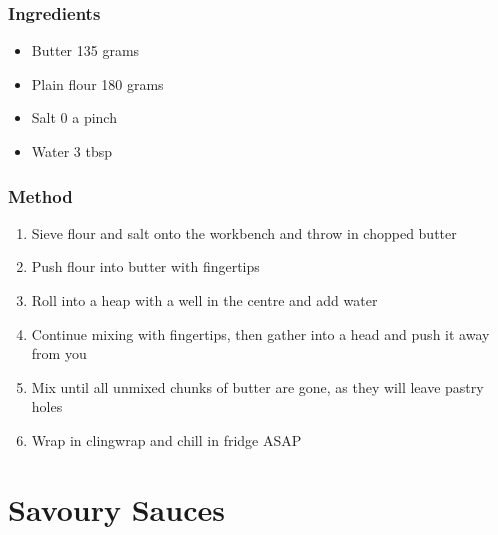 \documentclass[]{article}
\begin{document}
\subsubsection*{\Large Ingredients}
\begin{multicols}{2}
\begin{itemize}
 \item Butter \hfill 135 grams
 \item Plain flour \hfill 180 grams
 \item Salt \hfill 0 a pinch
 \item Water \hfill 3 tbsp
\end{itemize}
\end{multicols}
\subsubsection*{\Large Method}
\begin{enumerate}[font=\huge\color{accent}]
	\item Sieve flour and salt onto the workbench and throw in chopped butter
	\item Push flour into butter with fingertips
	\item Roll into a heap with a well in the centre and add water
	\item Continue mixing with fingertips, then gather into a head and push it away from you
	\item Mix until all unmixed chunks of butter are gone, as they will leave pastry holes
	\item Wrap in clingwrap and chill in fridge ASAP
\end{enumerate}
\newpage
{}
\section*{\center\Huge\color{accent}Savoury Sauces}
\label{cat:Savoury Sauces}
\label{rec:Basil Pesto}
\end{document}
